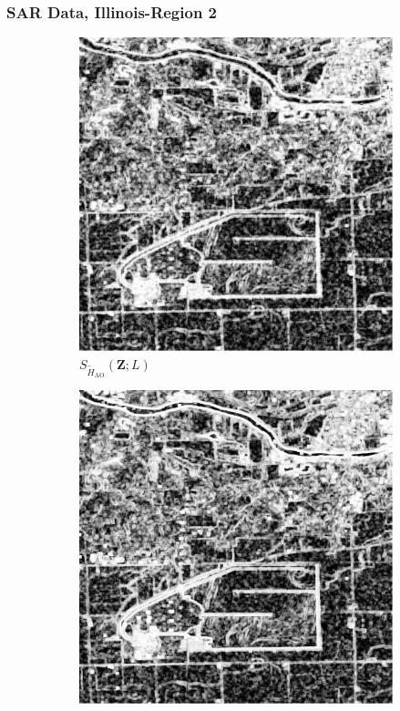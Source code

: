\documentclass[aspectratio=1610,10pt]{beamer}
\begin{document}
\begin{frame} \frametitle{\large{SAR Data, Illinois-Region 2 }}\vspace{-0.1cm}
\begin{figure}[H]
  \centering
  \begin{subfigure}[b]{0.3\textwidth}
    \centering
    \includegraphics[width=\textwidth]{../../Figures/PNG/Entropy_Illinois_1024_36L_AO_200b}
    \caption{$S_{\widetilde{H}_{\text{AO}}}(\bm{Z}; L)$}
    \label{fig:real_images_test_Illinois-1}
  \end{subfigure}
  \hfill
  \begin{subfigure}[b]{0.3\textwidth}
    \centering
    \includegraphics[width=\textwidth]{../../Figures/PNG/cv_Illinois_crops_1024}

\end{subfigure}
\end{figure}
\end{frame}
\end{document}
